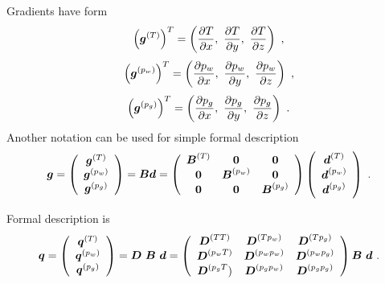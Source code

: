 \documentclass[12pt]{book}
\newcommand{\mbf}[1]{\mbox{\boldmath$#1$}}
\newcommand{\del}[2]{\mbox{$\displaystyle\frac{#1}{#2}$}}
\newcommand{\ppd}[2]{\del{\partial{#1}}{\partial{#2}}}
\begin{document}
Gradients have form
\begin{equation}
\left(\mbf{g}^{(T)}\right)^T = \left(\ppd{T}{x},\ \ppd{T}{y},\ \ppd{T}{z}\right)\ ,
\end{equation}
\begin{equation}
\left(\mbf{g}^{(p_w)}\right)^T = \left(\ppd{p_w}{x},\ \ppd{p_w}{y},\ \ppd{p_w}{z}\right)\ ,
\end{equation}
\begin{equation}
\left(\mbf{g}^{(p_g)}\right)^T = \left(\ppd{p_g}{x},\ \ppd{p_g}{y},\ \ppd{p_g}{z}\right)\ .
\end{equation}
Another notation can be used for simple formal description
\begin{equation}\label{defgradmatth}
\mbf{g} = \left(\begin{array}{c}
\mbf{g}^{(T)}
\\
\mbf{g}^{(p_w)}
\\
\mbf{g}^{(p_g)}
\end{array}\right)
= \mbf{B} \mbf{d} =
\left(\begin{array}{ccc}
\mbf{B}^{(T)} & \mbf{0}         & \mbf{0}
\\
\mbf{0}       & \mbf{B}^{(p_w)} & \mbf{0}
\\
\mbf{0}       & \mbf{0}         & \mbf{B}^{(p_g)}
\\
\end{array}\right)
\left(\begin{array}{c}
\mbf{d}^{(T)}
\\
\mbf{d}^{(p_w)}
\\
\mbf{d}^{(p_g)}
\end{array}\right)\ .
\end{equation}

Formal description is
\begin{equation}\label{defcondmatmatth}
\mbf{q} = \left(\begin{array}{c}
\mbf{q}^{(T)}
\\
\mbf{q}^{(p_w)}
\\
\mbf{q}^{(p_g)}
\end{array}\right)
= \mbf{D}\ \mbf{B}\ \mbf{d} =
\left(\begin{array}{ccc}
\mbf{D}^{(TT)}   & \mbf{D}^{(Tp_w)}   & \mbf{D}^{(Tp_g)}
\\
\mbf{D}^{(p_wT)} & \mbf{D}^{(p_wp_w)} & \mbf{D}^{(p_wp_g)}
\\
\mbf{D}^{(p_gT}) & \mbf{D}^{(p_gp_w)} & \mbf{D}^{(p_gp_g)}
\\
\end{array}\right)
\mbf{B}\ \mbf{d}\ .
\end{equation}
\end{document}
